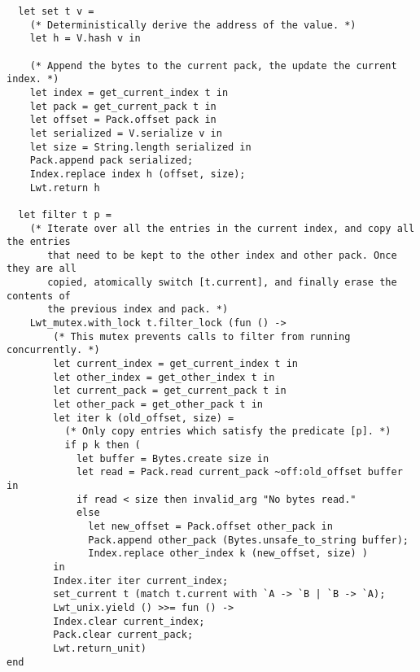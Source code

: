 \begin{verbatim}
  let set t v =
    (* Deterministically derive the address of the value. *)
    let h = V.hash v in

    (* Append the bytes to the current pack, the update the current index. *)
    let index = get_current_index t in
    let pack = get_current_pack t in
    let offset = Pack.offset pack in
    let serialized = V.serialize v in
    let size = String.length serialized in
    Pack.append pack serialized;
    Index.replace index h (offset, size);
    Lwt.return h

  let filter t p =
    (* Iterate over all the entries in the current index, and copy all the entries
       that need to be kept to the other index and other pack. Once they are all
       copied, atomically switch [t.current], and finally erase the contents of
       the previous index and pack. *)
    Lwt_mutex.with_lock t.filter_lock (fun () ->
        (* This mutex prevents calls to filter from running concurrently. *)
        let current_index = get_current_index t in
        let other_index = get_other_index t in
        let current_pack = get_current_pack t in
        let other_pack = get_other_pack t in
        let iter k (old_offset, size) =
          (* Only copy entries which satisfy the predicate [p]. *)
          if p k then (
            let buffer = Bytes.create size in
            let read = Pack.read current_pack ~off:old_offset buffer in
            if read < size then invalid_arg "No bytes read."
            else
              let new_offset = Pack.offset other_pack in
              Pack.append other_pack (Bytes.unsafe_to_string buffer);
              Index.replace other_index k (new_offset, size) )
        in
        Index.iter iter current_index;
        set_current t (match t.current with `A -> `B | `B -> `A);
        Lwt_unix.yield () >>= fun () ->
        Index.clear current_index;
        Pack.clear current_pack;
        Lwt.return_unit)
end
\end{verbatim}